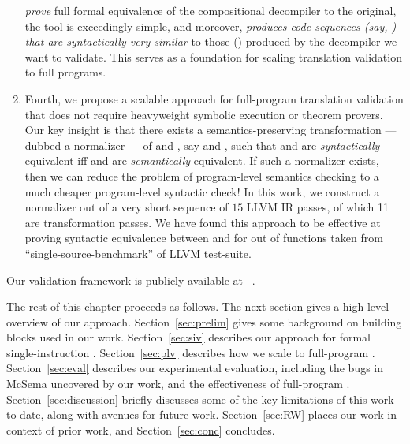 \begin{enumerate}
  \emph{prove} full formal equivalence of the compositional decompiler to the original,
  the tool is exceedingly simple, and moreover, 
  \emph{produces code sequences (say, \Tp) that are syntactically very similar} to those 
  () produced by the decompiler we want to validate.
  This serves as a foundation for scaling translation validation to full programs.
%
  \item Fourth, we propose a scalable approach for full-program translation validation
  that does not require heavyweight symbolic execution or theorem provers.  Our key 
  insight is that there exists a semantics-preserving transformation --- dubbed a  
  normalizer --- of \T and \TP, say  and , such 
  that
   and  are \emph{syntactically} equivalent iff  
  and  are \emph{semantically} equivalent.  If such a normalizer
  exists, then we can reduce the problem of program-level semantics checking to
  a much cheaper program-level syntactic check!  In this work, we construct a 
  normalizer out of a very short sequence of $15$ LLVM IR passes, of which 11 are
  transformation passes.  We have found this approach to be effective at proving
  syntactic equivalence between  and \Tp for \plvP out of \plvT functions
  taken from  ``single-source-benchmark'' of LLVM test-suite.
\end{enumerate}

Our validation framework is publicly available at ~\cite{lifter-validator-github}.

%
The rest of this chapter proceeds as follows.
%
The next section gives a high-level overview of our approach.
%
Section~\ref{sec:prelim} gives some background on building blocks used in our work.
%
Section~\ref{sec:siv} describes our approach for formal single-instruction \TV.
%
Section~\ref{sec:plv} describes how we scale to full-program \TV.
%
Section~\ref{sec:eval} describes our experimental evaluation, including the bugs 
in McSema uncovered by our work, and the effectiveness of full-program \TV.
%
Section~\ref{sec:discussion} briefly discusses some of the key limitations of this work
to date, along with avenues for future work.
%
Section~\ref{sec:RW} places our work in context of prior work, and
Section~\ref{sec:conc} concludes.




